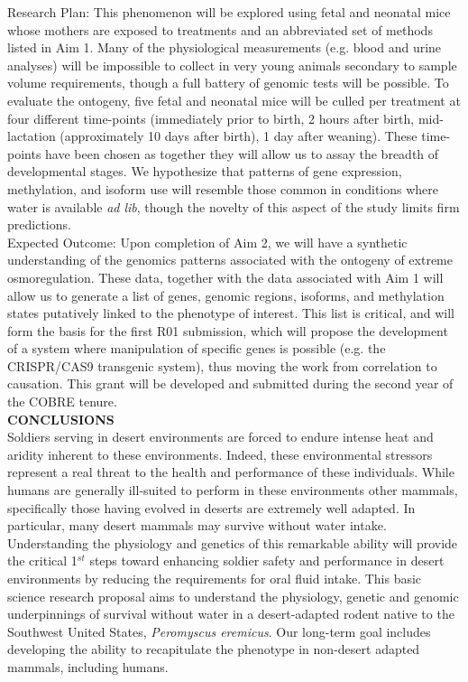 \documentclass[12pt]{article}
\begin{document}
Research Plan: This phenomenon will be explored using fetal and neonatal mice whose mothers are exposed to treatments and an abbreviated set of methods listed in Aim 1. Many of the physiological measurements  (e.g. blood and urine analyses) will be impossible to collect in very young animals secondary to sample volume requirements, though a full battery of genomic tests will be possible. To evaluate the ontogeny, five fetal and neonatal mice will be culled per treatment at four different time-points (immediately prior to birth, 2 hours after birth, mid-lactation (approximately 10 days after birth), 1 day after weaning). These time-points have been chosen as together they will allow us to assay the breadth of developmental stages.  We hypothesize that patterns of gene expression, methylation, and isoform use will resemble those common in conditions where water is available \textit{ad lib}, though the novelty of this aspect of the study limits firm predictions. \\

Expected Outcome: Upon completion of Aim 2, we will have a synthetic understanding of the genomics patterns associated with the ontogeny of extreme osmoregulation. These data, together with the data associated with Aim 1 will allow us to generate a list of genes, genomic regions, isoforms, and methylation states putatively linked to the phenotype of interest. This list is critical, and will form the basis for the first R01 submission, which will propose the development of a system where manipulation of specific genes is possible (e.g. the CRISPR/CAS9 transgenic system), thus moving the work from correlation to causation. This grant will be developed and submitted during the second year of the COBRE tenure. \\



\noindent \textbf{CONCLUSIONS} \\

Soldiers serving in desert environments are forced to endure intense heat and aridity inherent to these environments. Indeed, these environmental stressors represent a real threat to the health and performance of these individuals. While humans are generally ill-suited to perform in these environments other mammals, specifically those having evolved in deserts are extremely well adapted. In particular, many desert mammals may survive without water intake. Understanding the physiology and genetics of this remarkable ability will provide the critical 1$^{st}$ steps toward enhancing soldier safety and performance in desert environments by reducing the requirements for oral fluid intake. This basic science research proposal aims to understand the physiology, genetic and genomic underpinnings of survival without water in a desert-adapted rodent native to the Southwest United States, \textit{Peromyscus eremicus}. Our long-term goal includes developing the ability to recapitulate the phenotype in non-desert adapted mammals, including humans.
\end{document}
